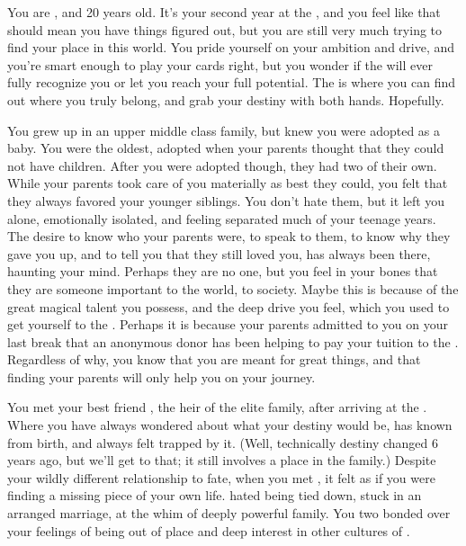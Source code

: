 \documentclass[char]{GL2020}
\begin{document}
\name{\cAmbition{}}

You are \cAmbition{\intro}, and 20 years old. It's your second year at the \pSchool{}, and you feel like that should mean you have things figured out, but you are still very much trying to find your place in this world. You pride yourself on your ambition and drive, and you're smart enough to play your cards right, but you wonder if the \pTechies{} will ever fully recognize you or let you reach your full potential. The \pSchool{} is where you can find out where you truly belong, and grab your destiny with both hands. Hopefully.  

You grew up in an upper middle class family,  but knew you were adopted as a baby.  You were the oldest, adopted when your parents thought that they could not have children.  After you were adopted though, they had two of their own.  While your parents took care of you materially as best they could, you felt that they always favored your younger siblings.  You don’t hate them, but it left you alone, emotionally isolated, and feeling separated much of your teenage years.  The desire to know who your parents were, to speak to them, to know why they gave you up,  and to tell you that they still loved you, has always been there, haunting your mind. Perhaps they are no one, but you feel in your bones that they are someone important to the world, to society. Maybe this is because of the great magical talent you possess, and the deep drive you feel, which you used to get yourself to the \pSchool{}. Perhaps it is because your parents admitted to you on your last break that an anonymous donor has been helping to pay your tuition to the \pSc{}. Regardless of why, you know that you are meant for great things, and that finding your parents will only help you on your journey.  

You met your best friend \cHeir{\intro}, the heir of the elite \cHeir{\formal} family, after arriving at the \pSc{}. Where you have always wondered about what your destiny would be, \cHeir{} has known from birth, and always felt trapped by it. (Well, technically \cHeir{\their} destiny changed 6 years ago, but we’ll get to that; it still involves a place in the \cHeir{\formal} family.) Despite your wildly different relationship to fate, when you met \cHeir{\them}, it felt as if you were finding a missing piece of your own life. \cHeir{\They} hated being tied down, stuck in an arranged marriage, at the whim of \cHeir{\their} deeply powerful family. You two bonded over your feelings of being out of place and deep interest in other cultures of \pEarth{}. 
\end{document}
